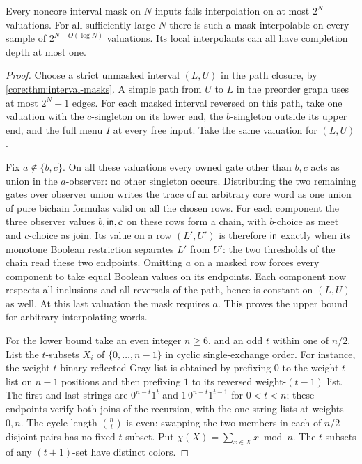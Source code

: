 \begin{theorem}\label{core:thm:interval-mask-locality-rate}
Every noncore interval mask on $N$ inputs fails interpolation on at
most $2^N$ valuations. For all sufficiently large $N$ there is such
a mask interpolable on every sample of $2^{N-O(\log N)}$ valuations.
Its local interpolants can all have completion depth at most one.
\end{theorem}
\begin{proof}
Choose a strict unmasked interval $(L,U)$ in the path closure, by
\cref{core:thm:interval-masks}. A simple path from $U$ to $L$ in
the preorder graph uses at most $2^N-1$ edges. For each masked interval
reversed on this path, take one valuation with the $c$-singleton on
its lower end, the $b$-singleton outside its upper end, and the full
menu $I$ at every free input. Take the same valuation for $(L,U)$.

Fix $a\notin\{b,c\}$. On all these valuations every owned gate other
than $b,c$ acts as union in the $a$-observer: no other singleton occurs.
Distributing the two remaining gates over observer union writes the
trace of an arbitrary core word as one union of pure bichain formulas
valid on all the chosen rows. For each component the three observer
values $b,\mathsf{in},c$ on these rows form a chain, with $b$-choice as meet
and $c$-choice as join. Its value on a row $(L',U')$ is therefore
$\mathsf{in}$ exactly when its monotone Boolean restriction separates $L'$
from $U'$: the two thresholds of the chain read these two endpoints.
Omitting $a$ on a masked row forces every component to take equal
Boolean values on its endpoints. Each component now respects all
inclusions and all reversals of the path, hence is constant on
$(L,U)$ as well. At this last valuation the mask requires $a$.
This proves the upper bound for arbitrary interpolating words.

For the lower bound take an even integer $n\ge6$, and an odd $t$
within one of $n/2$. List the $t$-subsets $X_i$ of
$\{0,\ldots,n-1\}$ in cyclic single-exchange order. For instance,
the weight-$t$ binary reflected Gray list is obtained by prefixing
$0$ to the weight-$t$ list on $n-1$ positions and then prefixing
$1$ to its reversed weight-$(t-1)$ list. The first and last strings
are $0^{n-t}1^t$ and $1\,0^{n-t}1^{t-1}$ for $0<t<n$;
these endpoints verify both joins of the recursion, with the
one-string lists at weights $0,n$. The cycle length $\binom nt$ is
even: swapping the two members in each of $n/2$ disjoint pairs has
no fixed $t$-subset. Put $\chi(X)=\sum_{x\in X}x\bmod n$.
The $t$-subsets of any $(t+1)$-set have distinct colors.


\end{proof}
